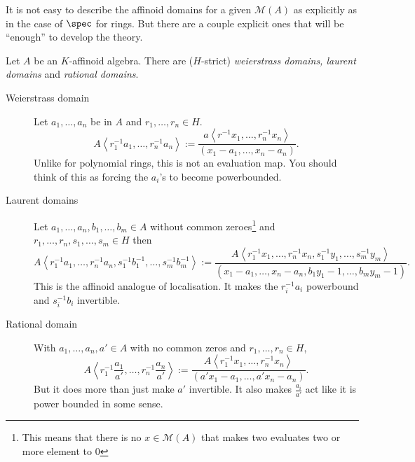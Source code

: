 It is not easy to describe the affinoid domains for a given $\mathcal{M} (A)$ as explicitly as in the case of $\spec$ for rings. 
But there are a couple explicit ones that will be ``enough'' to develop the theory. 
\begin{definition}
	Let $A$ be an $K$-affinoid algebra. 
	There are ($H$-strict) \emph{weierstrass domains, laurent domains} and \emph{rational domains}. 
	\begin{description}
		\item[Weierstrass domain] Let $a_1, \ldots, a_n$ be in $A$ and $r_1, \ldots, r_n \in H$. 
			\[
				A\left<r_1^{-1}a_1, \ldots, r_n^{-1}a_n \right> := \frac{a\left<r^{-1}x_1, \ldots, r^{-1}_nx_n \right>}{(x_1-a_1, \ldots, x_n - a_n)}
			.\] 
			Unlike for polynomial rings, this is not an evaluation map. You should think of this as forcing the $a_i$'s to become powerbounded. 
		\item [Laurent domains]
			Let $a_1, \ldots, a_n, b_1, \ldots, b_m \in A$ without common zeroes\footnote{This means that there is no $x \in \mathcal{M} (A)$ that makes two evaluates two or more element to $0$} and $r_1,\ldots, r_n, s_1, \ldots, s_m \in H$ then \[
				A\left<r_1^{-1}a_1, \ldots, r_n^{-1}a_n, s^{-1}_1b_1^{-1}, \ldots, s^{-1}_mb_m^{-1} \right> := \frac{A\left<r^{-1}_1x_1, \ldots, r^{-1}_nx_n,s^{-1}_1y_1, \ldots,s_m^{-1} y_m  \right>}{(x_1 - a_1, \ldots, x_n - a_n, b_1 y_1 - 1, \ldots, b_m y_m - 1)}
			.\] 
			This is the affinoid analogue of localisation. It makes the $r_i^{-1}a_i$ powerbound and $s_i^{-1}b_i$ invertible. 
		\item[Rational domain] With $a_1, \ldots, a_n, a' \in A$ with no common zeros and $r_1, \ldots, r_n \in H$,
			\[
				A \left<r_1^{-1}\frac{a_1}{a'}, \ldots, r_n^{-1}\frac{a_n}{a'} \right> := \frac{A\left<r_1^{-1}x_1, \ldots, r_n^{-1}x_n \right>}{(a' x_1 - a_1, \ldots, a' x_n - a_n)}
			.\] 
			But it does more than just make $a'$ invertible. 
			It also makes $\frac{a_i}{ a'}$ act like it is power bounded in some sense. 
	\end{description}
\end{definition}

